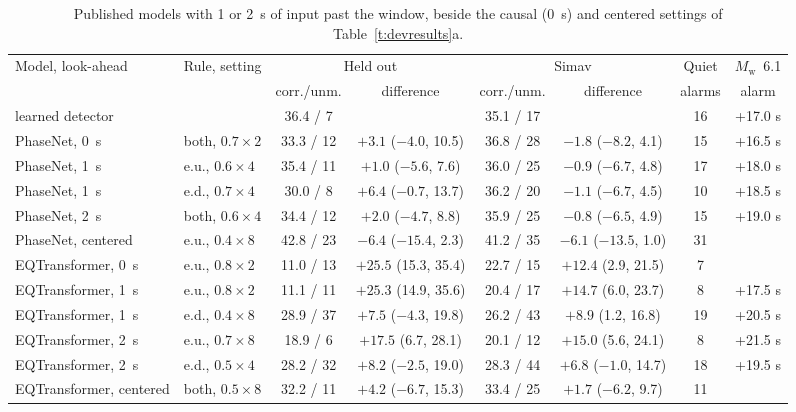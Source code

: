 \documentclass[11pt,a4paper]{article}
\newcommand{\Mw}{$M_\mathrm{w}$}
\begin{document}
\begin{table}[htbp]
  \centering\scriptsize\setlength{\tabcolsep}{2.5pt}
  \caption{Published models with 1 or 2~s of input past the window, beside the
  causal (0~s) and centered settings of Table~\ref{t:devresults}a.}\label{t:ahead}
  \begin{tabular}{@{}llcccccc@{}}
    \toprule
    Model, look-ahead & Rule, setting & \multicolumn{2}{c}{Held out} & \multicolumn{2}{c}{Simav} & Quiet & \Mw{}~6.1 \\
    \cmidrule(lr){3-4}\cmidrule(lr){5-6}
    & & corr./unm. & difference & corr./unm. & difference & alarms & alarm \\
    \midrule
    learned detector              &                      & 36.4 / 7  &                       & 35.1 / 17 &                      & 16 & +17.0 s \\
    \addlinespace
    PhaseNet, 0~s                 & both, $0.7\times2$   & 33.3 / 12 & $+3.1$ ($-4.0$, 10.5) & 36.8 / 28 & $-1.8$ ($-8.2$, 4.1) & 15 & +16.5 s \\
    PhaseNet, 1~s                 & e.u., $0.6\times4$ & 35.4 / 11 & $+1.0$ ($-5.6$, 7.6) & 36.0 / 25 & $-0.9$ ($-6.7$, 4.8) & 17 & +18.0 s \\
    PhaseNet, 1~s                 & e.d., $0.7\times4$ & 30.0 / 8 & $+6.4$ ($-0.7$, 13.7) & 36.2 / 20 & $-1.1$ ($-6.7$, 4.5) & 10 & +18.5 s \\
    PhaseNet, 2~s                 & both, $0.6\times4$   & 34.4 / 12 & $+2.0$ ($-4.7$, 8.8)  & 35.9 / 25 & $-0.8$ ($-6.5$, 4.9) & 15 & +19.0 s \\
    PhaseNet, centered            & e.u., $0.4\times8$ & 42.8 / 23 & $-6.4$ ($-15.4$, 2.3) & 41.2 / 35 & $-6.1$ ($-13.5$, 1.0) & 31 & \\
    \addlinespace
    EQTransformer, 0~s            & e.u., $0.8\times2$ & 11.0 / 13 & $+25.5$ (15.3, 35.4) & 22.7 / 15 & $+12.4$ (2.9, 21.5) & 7 & \\
    EQTransformer, 1~s            & e.u., $0.8\times2$ & 11.1 / 11 & $+25.3$ (14.9, 35.6) & 20.4 / 17 & $+14.7$ (6.0, 23.7) & 8 & +17.5 s \\
    EQTransformer, 1~s            & e.d., $0.4\times8$ & 28.9 / 37 & $+7.5$ ($-4.3$, 19.8) & 26.2 / 43 & $+8.9$ (1.2, 16.8) & 19 & +20.5 s \\
    EQTransformer, 2~s            & e.u., $0.7\times8$ & 18.9 / 6 & $+17.5$ (6.7, 28.1) & 20.1 / 12 & $+15.0$ (5.6, 24.1) & 8 & +21.5 s \\
    EQTransformer, 2~s            & e.d., $0.5\times4$ & 28.2 / 32 & $+8.2$ ($-2.5$, 19.0) & 28.3 / 44 & $+6.8$ ($-1.0$, 14.7) & 18 & +19.5 s \\
    EQTransformer, centered       & both, $0.5\times8$   & 32.2 / 11 & $+4.2$ ($-6.7$, 15.3) & 33.4 / 25 & $+1.7$ ($-6.2$, 9.7) & 11 & \\
    \bottomrule
  \end{tabular}
\end{table}
\end{document}
